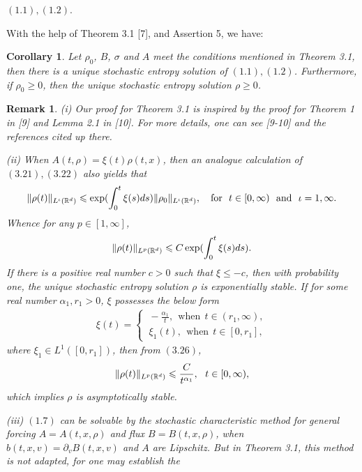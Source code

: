 \documentclass[11pt]{article}
\newtheorem{corollary}{Corollary}[section]
\newtheorem{remark}{Remark}[section]
\def\geq{\geqslant}\def\leq{\leqslant}
\begin{document}
$(1.1), (1.2)$.
 \vskip2mm\par
With the help of Theorem 3.1 [7], and Assertion 5, we have:
\begin{corollary}
Let $\rho_0$, $B$, $\sigma$ and $A$ meet the conditions mentioned in
Theorem 3.1, then there is a unique stochastic entropy solution of
$(1.1), (1.2)$. Furthermore, if $\rho_0\geq 0$, then the unique
stochastic entropy solution $\rho \geq 0$.
\end{corollary}
\begin{remark}
(i)  Our proof for Theorem 3.1 is inspired by the proof for Theorem
1 in [9] and Lemma 2.1 in [10]. For more details, one can see [9-10]
and the references cited up there.
 \vskip1mm\par
(ii) When $A(t,\rho)=\xi(t)\rho(t,x)$, then an analogue calculation
of $(3.21), (3.22)$ also yields that
\begin{eqnarray*}
\|\rho(t)\|_{L^\iota(\mR^d)}\leq
\exp(\int^t_0\xi(s)ds)\|\rho_0\|_{L^\iota(\mR^d)},
 \quad \mbox{for} \ \ t\in [0,\infty) \ \ \mbox{and} \ \ \iota=1, \infty.
\end{eqnarray*}
Whence for any $p\in [1,\infty]$,
\begin{eqnarray}\label{3.26}
\|\rho(t)\|_{L^p(\mR^d)}\leq C\exp(\int^t_0\xi(s)ds).
\end{eqnarray}
If there is a positive real number $c>0$ such that $\xi\leq -c$,
then with probability one, the unique stochastic entropy solution
$\rho$ is exponentially stable. If for some real number
$\alpha_1,r_1>0$, $\xi$ possesses the below form
\begin{eqnarray*}
\xi(t)=\left\{
 \begin{array}{ll} \ -\frac{\alpha_1}{t}, \ \
\mbox{when} \ \  t\in (r_1,\infty),
\\ \ \xi_1(t), \ \ \mbox{when} \ \  t\in [0,r_1], \end{array} \right.
\end{eqnarray*}
where $\xi_1\in L^1([0,r_1])$, then from $(3.26)$,
\begin{eqnarray*}
\|\rho(t)\|_{L^p(\mR^d)}\leq \frac{C}{t^{\alpha_1}},  \ \ t\in
[0,\infty),
\end{eqnarray*}
which implies  $\rho$ is asymptotically stable.
 \vskip1mm\par
(iii) $(1.7)$ can be solvable by the stochastic characteristic
method for general forcing $A=A(t,x,\rho)$ and flux $B=B(t,x,\rho)$,
when $b(t,x,v)=\partial_vB(t,x,v)$ and $A$ are Lipschitz. But in
Theorem 3.1, this method is not adapted, for one may establish the

\end{remark}
\end{document}
